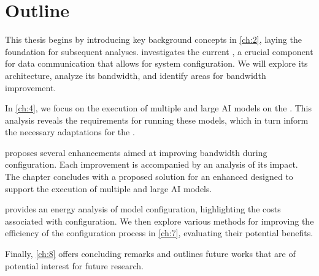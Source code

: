 \section{Outline}
This thesis begins by introducing key background concepts in \cref{ch:2}, laying the foundation for subsequent analyses.
 investigates the current \confignoc{}, a crucial component for data communication that allows for system configuration.
We will explore its architecture, analyze its bandwidth, and identify areas for bandwidth improvement.

In \cref{ch:4}, we focus on the execution of multiple and large AI models on the \graicore{}.
This analysis reveals the requirements for running these models, which in turn inform the necessary adaptations for the \confignoc{}.

 proposes several \confignoc{} enhancements aimed at improving bandwidth during configuration.
Each improvement is accompanied by an analysis of its impact.
The chapter concludes with a proposed solution for an enhanced \confignoc{} designed to support the execution of multiple and large AI models.

 provides an energy analysis of model configuration, highlighting the costs associated with configuration. 
We then explore various methods for improving the efficiency of the configuration process in \cref{ch:7}, evaluating their potential benefits.

Finally, \cref{ch:8} offers concluding remarks and outlines future works that are of potential interest for future research.




